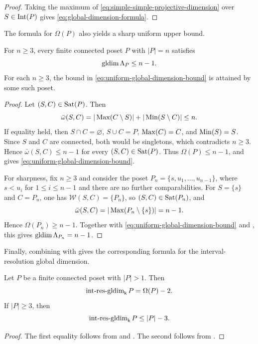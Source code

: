 \begin{proof}
Taking the maximum of
\eqref{eq:simple-simple-projective-dimension} over
$S\in\operatorname{Int}(P)$ gives
\eqref{eq:global-dimension-formula}.
\end{proof}


The formula for $\Omega(P)$ also yields a sharp uniform upper bound.

\begin{corollary}    
\label{cor:uniform-global-dimension-bound}
For $n\geq3$, every finite connected poset $P$ with $|P|=n$
satisfies
\begin{equation}
\label{eq:uniform-global-dimension-bound}
\operatorname{gldim}\Lambda_P\leq n-1.
\end{equation}
For each $n \geq 3$, the bound in
\eqref{eq:uniform-global-dimension-bound} is attained by some such
poset.
\end{corollary}




\begin{proof}
Let $(S,C)\in\operatorname{Sat}(P)$.  Then
\[
\bar\omega(S,C)
=
|\operatorname{Max}(C\setminus S)|
+
|\operatorname{Min}(S\setminus C)|
\leq n.
\]
If equality held, then $S\cap C=\varnothing$,
$S\cup C=P$, $\operatorname{Max}(C)=C$, and $\operatorname{Min}(S)=S$.
Since $S$ and $C$ are connected, both would be singletons, which
contradicts $n\geq3$.  Hence
$\bar\omega(S,C)\leq n-1$ for every $(S,C)\in\operatorname{Sat}(P)$.
Thus $\Omega(P)\leq n-1$, and
 gives
\eqref{eq:uniform-global-dimension-bound}.

For sharpness, fix $n\geq3$ and consider the poset
$P_n=\{s,u_1,\ldots,u_{n-1}\}$,
where $s<u_i$ for $1\leq i\leq n-1$ and there are no further comparabilities.
For $S=\{s\}$ and $C=P_n$, one has
$\mathcal W(S,C)=\{P_n\}$, so $(S,C)\in\operatorname{Sat}(P_n)$, and
\[
\bar\omega(S,C)
=
|\operatorname{Max}(P_n\setminus\{s\})|
=
n-1.
\]
Hence $\Omega(P_n)\geq n-1$.  Together with
\eqref{eq:uniform-global-dimension-bound} and
, this gives
$\operatorname{gldim}\Lambda_{P_n}=n-1$.
\end{proof}


Finally, combining  with   gives the
corresponding formula for the interval-resolution global dimension.

\begin{corollary}
\label{cor:interval-resolution-global-dimension-formula}
Let $P$ be a finite connected poset with $|P|>1$. Then
\begin{equation}
\label{eq:interval-resolution-global-dimension-formula}
\operatorname{int\text{-}res\text{-}gldim}_{\mathsf{k}} P=\Omega(P)-2.
\end{equation}
If $|P|\geq3$, then
\begin{equation}
\label{eq:uniform-interval-resolution-bound}
\operatorname{int\text{-}res\text{-}gldim}_{\mathsf{k}} P\leq |P|-3.
\end{equation}
\end{corollary}

\begin{proof}
The first equality follows from
 and . The second follows from
.
\end{proof}



